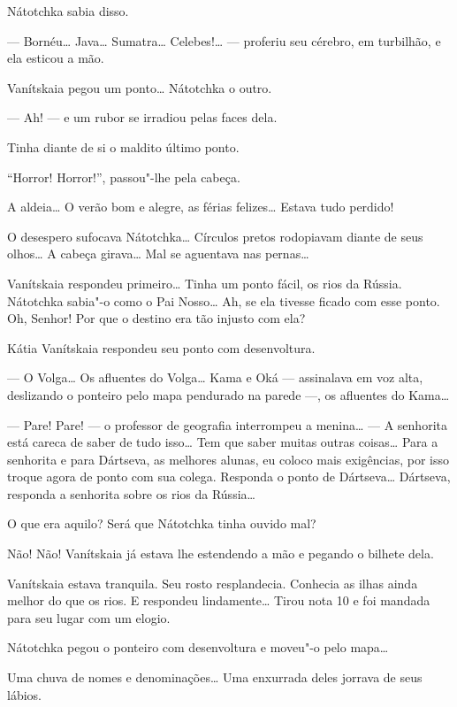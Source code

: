 Nátotchka sabia disso.

--- Bornéu\ldots{} Java\ldots{} Sumatra\ldots{} Celebes!\ldots{} --- proferiu seu cérebro,
em turbilhão, e ela esticou a mão.

Vanítskaia pegou um ponto\ldots{} Nátotchka o outro.

--- Ah! --- e um rubor se irradiou pelas faces dela.

Tinha diante de si o maldito último ponto.

``Horror! Horror!'', passou"-lhe pela cabeça.

A aldeia\ldots{} O verão bom e alegre, as férias felizes\ldots{} Estava tudo
perdido!

O desespero sufocava Nátotchka\ldots{} Círculos pretos rodopiavam diante de
seus olhos\ldots{} A cabeça girava\ldots{} Mal se aguentava nas pernas\ldots{}

Vanítskaia respondeu primeiro\ldots{} Tinha um ponto fácil, os rios da
Rússia. Nátotchka sabia"-o como o Pai Nosso\ldots{} Ah, se ela tivesse ficado
com esse ponto. Oh, Senhor! Por que o destino era tão injusto com ela?

Kátia Vanítskaia respondeu seu ponto com desenvoltura.

--- O Volga\ldots{} Os afluentes do Volga\ldots{} Kama e Oká --- assinalava em voz
alta, deslizando o ponteiro pelo mapa pendurado na parede ---, os
afluentes do Kama\ldots{}

--- Pare! Pare! --- o professor de geografia interrompeu a menina\ldots{} ---
A senhorita está careca de saber de tudo isso\ldots{} Tem que saber muitas
outras coisas\ldots{} Para a senhorita e para Dártseva, as melhores alunas,
eu coloco mais exigências, por isso troque agora de ponto com sua
colega. Responda o ponto de Dártseva\ldots{} Dártseva, responda a senhorita
sobre os rios da Rússia\ldots{}

O que era aquilo? Será que Nátotchka tinha ouvido mal?

Não! Não! Vanítskaia já estava lhe estendendo a mão e pegando o bilhete
dela.

Vanítskaia estava tranquila. Seu rosto resplandecia. Conhecia as ilhas
ainda melhor do que os rios. E respondeu lindamente\ldots{} Tirou nota 10 e
foi mandada para seu lugar com um elogio.

Nátotchka pegou o ponteiro com desenvoltura e moveu"-o pelo mapa\ldots{}

Uma chuva de nomes e denominações\ldots{} Uma enxurrada deles jorrava de seus
lábios.

